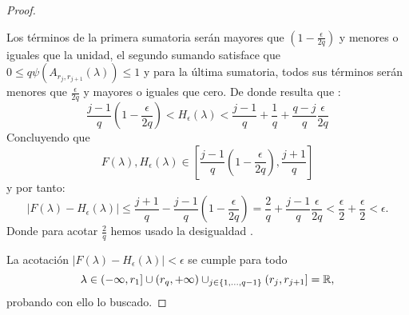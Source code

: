 \begin{proof}
\begin{itemize}
        Los términos de la primera sumatoria serán mayores que $\left(1-\frac{\epsilon}{2q} \right)$ y menores o iguales que la unidad, 
        el segundo sumando satisface que 
        $0 \leq q\psi( A_{r_j, r_{j+1}}(\lambda)) \leq 1$
        y para la última sumatoria, todos sus términos serán menores que $\frac{\epsilon}{2q}$ y mayores o iguales que cero.
        De donde resulta que : 
        \begin{equation}
            \frac{j-1}{q}\left(1-\frac{\epsilon}{2q} \right)  
            <
            H_\epsilon(\lambda) 
            <
            \frac{j-1}{q} 
            + 
            \frac{1}{q} 
            + 
            \frac{q-j}{q} \frac{\epsilon}{2q} 
        \end{equation}
        Concluyendo que 
        \begin{equation}
            F(\lambda), H_\epsilon(\lambda) 
            \in 
            \left[
                \frac{j-1}{q}\left(1-\frac{\epsilon}{2q}\right),
                \frac{j+1}{q}
            \right]
        \end{equation}
        y por tanto: 
        \begin{equation}
            | F(\lambda) - H_{\epsilon}(\lambda) | 
            \leq \frac{j+1}{q} -  \frac{j-1}{q}\left(1-\frac{\epsilon}{2q}\right)
            = 
            \frac{2}{q} + \frac{j-1}{q}\frac{\epsilon}{2q}
            < \frac{\epsilon}{2} + \frac{\epsilon}{2}
            < \epsilon.
        \end{equation}
        Donde para acotar $\frac{2}{q}$ hemos usado la desigualdad .
    \end{itemize}
    La acotación $| F(\lambda) - H_{\epsilon}(\lambda) | < \epsilon$ se cumple para todo
    \begin{equation}
        \lambda \in (- \infty, r_1] \cup (r_q,+\infty) \cup_{j \in \{1, ..., q-1\}} (r_{j},r_{j+1}] = \mathbb{R},
    \end{equation}
    probando con ello lo buscado.
\end{proof}      


